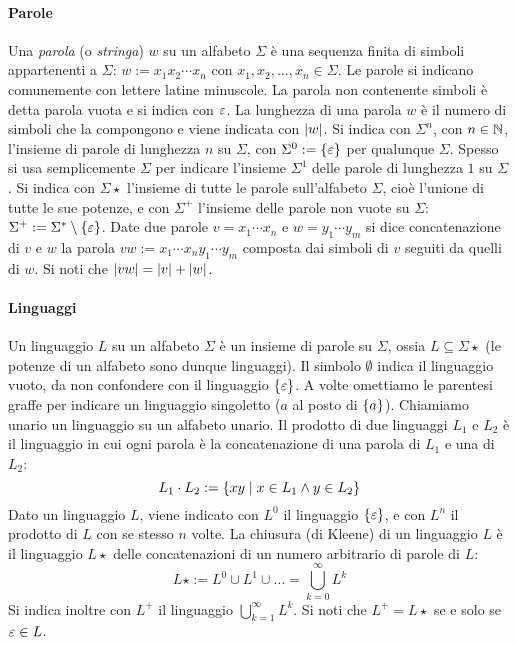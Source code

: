 \paragraph{Parole} Una \emph{parola} (o \emph{stringa}) $w$ su un alfabeto $\Sigma$ è una sequenza finita di simboli appartenenti a $\Sigma$: $w:=x_1 x_2 \cdots x_n$ con $x_1,x_2,\dots,x_n\in\Sigma$. Le parole si indicano comunemente con lettere latine minuscole. La parola non contenente simboli è detta parola vuota e si indica con $\varepsilon$. La lunghezza di una parola $w$ è il numero di simboli che la compongono e viene indicata con $|w|$. Si indica con $\Sigma^n$, con $n\in\mathbb N$, l'insieme di parole di lunghezza $n$ su $\Sigma$, con $\Sigma^0:=\left\{ \varepsilon \right\}$ per qualunque $\Sigma$. Spesso si usa semplicemente $\Sigma$ per indicare l'insieme $\Sigma^1$ delle parole di lunghezza $1$ su $\Sigma$. Si indica con $\Sigma\star$ l'insieme di tutte le parole sull'alfabeto $\Sigma$, cioè l'unione di tutte le sue potenze, e con $\Sigma^+$ l'insieme delle parole non vuote su $\Sigma$: $\Sigma^+ := \Sigma^*\setminus\left\{ \varepsilon \right\}$. Date due parole $v=x_1\cdots x_n$ e $w=y_1\cdots y_m$ si dice concatenazione di $v$ e $w$ la parola $vw:=x_1\cdots x_n y_1\cdots y_m$ composta dai simboli di $v$ seguiti da quelli di $w$. Si noti che $|vw|=|v|+|w|$.

\paragraph{Linguaggi} Un linguaggio $L$ su un alfabeto $\Sigma$ è un insieme di parole su $\Sigma$, ossia $L\subseteq\Sigma\star$ (le potenze di un alfabeto sono dunque linguaggi). Il simbolo $\emptyset$ indica il linguaggio vuoto, da non confondere con il linguaggio $\left\{ \varepsilon \right\}$.  A volte omettiamo le parentesi graffe per indicare un linguaggio singoletto ($a$ al posto di $\left\{ a \right\}$). Chiamiamo unario un linguaggio su un alfabeto unario. Il prodotto di due linguaggi $L_1$ e $L_2$ è il linguaggio in cui ogni parola è la concatenazione di una parola di $L_1$ e una di $L_2$:
\begin{equation*}
	L_1\cdot L_2 := \left\{ xy\mid x\in L_1 \land y\in L_2 \right\}
\end{equation*}
Dato un linguaggio $L$, viene indicato con $L^0$ il linguaggio $\left\{ \varepsilon \right\}$, e con $L^n$ il prodotto di $L$ con se stesso $n$ volte. La chiusura (di Kleene) di un linguaggio $L$ è il linguaggio $L\star$ delle concatenazioni di un numero arbitrario di parole di $L$:
\begin{equation*}
	L\star := L^0\cup L^1\cup\dots=\bigcup_{k=0}^\infty L^k
\end{equation*}
Si indica inoltre con $L^+$ il linguaggio $\bigcup_{k=1}^\infty L^k$. Si noti che $L^+=L\star$ se e solo se $\varepsilon\in L$.


